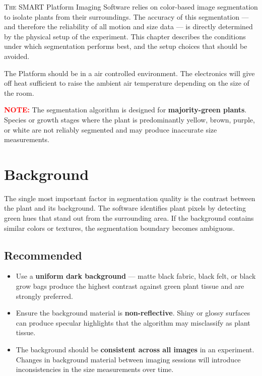 \documentclass[12pt,a4paper,oneside]{report}
\begin{document}
\lettrine{T}{he} SMART Platform Imaging Software relies on color-based image segmentation to isolate plants from their surroundings. The accuracy of this segmentation — and therefore the reliability of all motion and size data — is directly determined by the physical setup of the experiment. This chapter describes the conditions under which segmentation performs best, and the setup choices that should be avoided.

\vspace{0.5cm}
The Platform should be in a air controlled environment. The electronics will give off heat sufficient to raise the ambient air temperature depending on the size of the room.

\vspace{0.5cm}

\noindent
\textcolor{red}{\textbf{NOTE:}} The segmentation algorithm is designed for \textbf{majority-green plants}. Species or growth stages where the plant is predominantly yellow, brown, purple, or white are not reliably segmented and may produce inaccurate size measurements.

\section{Background}

The single most important factor in segmentation quality is the contrast between the plant and its background. The software identifies plant pixels by detecting green hues that stand out from the surrounding area. If the background contains similar colors or textures, the segmentation boundary becomes ambiguous.

\subsection*{Recommended}

\begin{itemize}
    \item Use a \textbf{uniform dark background} — matte black fabric, black felt, or black grow bags produce the highest contrast against green plant tissue and are strongly preferred.
    \item Ensure the background material is \textbf{non-reflective}. Shiny or glossy surfaces can produce specular highlights that the algorithm may misclassify as plant tissue.
    \item The background should be \textbf{consistent across all images} in an experiment. Changes in background material between imaging sessions will introduce inconsistencies in the size measurements over time.
\end{itemize}
\end{document}
